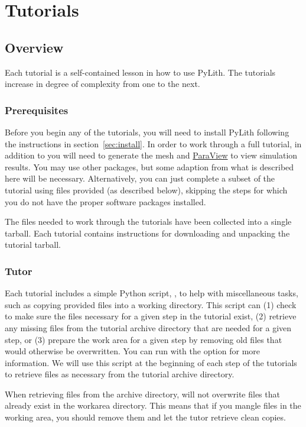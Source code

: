 \chapter{Tutorials}

\section{Overview}

Each tutorial is a self-contained lesson in how to use PyLith. The
tutorials increase in degree of complexity from one to the next. 

\subsection{Prerequisites}

Before you begin any of the tutorials, you will need to install PyLith
following the instructions in section~\ref{sec:install}. In order to
work through a full tutorial, in addition to  you
will need \href{http://www.hpfem.jku.at/netgen/}{}
to generate the mesh and \href{http://www.paraview.org}{ParaView} to
view simulation results. You may use other packages, but some adaption
from what is described here will be necessary. Alternatively, you can
just complete a subset of the tutorial using files provided (as
described below), skipping the steps for which you do not have the
proper software packages installed.

The files needed to work through the tutorials have been collected
into a single tarball. Each tutorial contains instructions for
downloading and unpacking the tutorial tarball.

\subsection{Tutor}

Each tutorial includes a simple Python script, , to
help with miscellaneous tasks, such as copying provided files into a
working directory. This script can (1) check to make sure the files
necessary for a given step in the tutorial exist, (2) retrieve any
missing files from the tutorial archive directory that are needed for
a given step, or (3) prepare the work area for a given step by
removing old files that would otherwise be overwritten. You can run
 with the  option for more
information. We will use this script at the beginning of each step of
the tutorials to retrieve files as necessary from the tutorial archive
directory.

\begin{tip}
  When retrieving files from the archive directory, 
  will not overwrite files that already exist in the workarea
  directory. This means that if you mangle files in the working area,
  you should remove them and let the tutor retrieve clean copies.
\end{tip}



